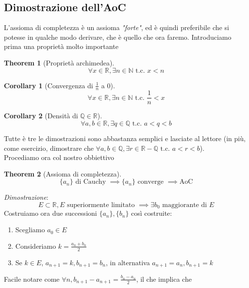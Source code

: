 \documentclass{article}
\newtheorem{theorem}{Theorem}[section]
\newtheorem{corollary}{Corollary}[theorem]
\begin{document}
        \subsection{Dimostrazione dell'AoC}
            L'assioma di completezza è un assioma \textit{"forte"}, ed è quindi preferibile che si potesse in qualche modo 
            derivare, che è quello che ora faremo. Introduciamo prima una proprietà molto importante
            \begin{theorem}[Proprietà archimedea]
                $$\forall x \in \mathbb{R}, \exists n \in \mathbb{N} \textrm{ t.c. } x < n$$
            \end{theorem}
            \begin{corollary}[Convergenza di $\frac{1}{n}$ a $0$]
                $$\forall x \in \mathbb{R}, \exists n \in \mathbb{N} \textrm{ t.c. } \frac{1}{n} < x$$
            \end{corollary}
            \begin{corollary}[Densità di $\mathbb{Q} \in \mathbb{R}$]
                $$\forall a, b \in \mathbb{R}, \exists q \in \mathbb{Q} \textrm{ t.c. } a < q < b$$
            \end{corollary}
            Tutte è tre le dimostrazioni sono abbastanza semplici e lasciate al lettore (in più, come esercizio, 
            dimostrare che $\forall a, b \in \mathbb{Q}, \exists r \in \mathbb{R} - \mathbb{Q} \textrm{ t.c. } a < r < b$). \\
            Procediamo ora col nostro obbiettivo
            \begin{theorem}[Assioma di completezza] 
                $$\{a_n\} \textrm{ di Cauchy } \implies \{a_n\} \textrm{ converge } \implies \textrm{AoC}$$
            \end{theorem}
            \textit{Dimostrazione}:
            $$E \subset \mathbb{R}, E \textrm{ superiormente limitato } \implies \exists b_0 \textrm{ maggiorante di } E$$
            Costruiamo ora due successioni $\{a_n\}, \{b_n\}$ così costruite:
            \begin{enumerate}
                \item Scegliamo $a_0 \in E$
                \item Consideriamo $k = \frac{a_n + b_n}{2}$
                \item Se $k \in E$, $a_{n+1} = k, b_{n+1} = b_n$, in alternativa $a_{n+1} = a_n, b_{n+1} = k$
            \end{enumerate}
            Facile notare come $\forall n, b_{n+1} - a_{n+1} = \frac{b_n - a_n}{2}$, il che implica che 
\end{document}
